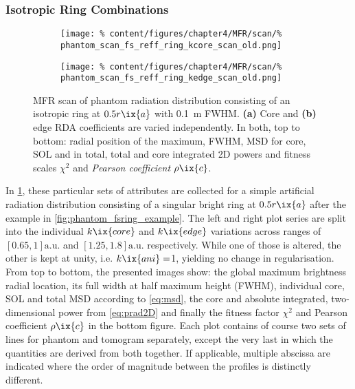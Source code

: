             \subsubsection*{Isotropic Ring Combinations}%
%
                \begin{figure}[t]%
                    \centering%
                    \begin{subfigure}{0.45\textwidth}%
                        \centering%
                        \texttt{[image: \%
                            content/figures/chapter4/MFR/scan/\%
                            phantom\_scan\_fs\_reff\_ring\_kcore\_scan\_old.png]}%
                        \caption{}%
                    \end{subfigure}%
                    \begin{subfigure}{0.45\textwidth}%
                        \centering%
                        \texttt{[image: \%
                            content/figures/chapter4/MFR/scan/\%
                            phantom\_scan\_fs\_reff\_ring\_kedge\_scan\_old.png]}%
                        \caption{}%
                    \end{subfigure}%
                    \caption{MFR scan of phantom radiation distribution consisting of an isotropic ring at $0.5r\ix{a}$ with \SI{0.1}{\meter} FWHM. \textbf{(a)} Core and \textbf{(b)} edge RDA coefficients are varied independently. In both, top to bottom: radial position of the maximum, FWHM, MSD for core, SOL and in total, total and core integrated 2D powers and fitness scales $\chi^{2}$ and \textit{Pearson coefficient} $\rho\ix{c}$.}\label{fig:phantom_scans_fsring_kani_coreEdge}%
                \end{figure}%
%
                In \cref{fig:phantom_scans_fsring_kani_coreEdge}, these particular sets of attributes are collected for a simple artificial radiation distribution consisting of a singular bright ring at $0.5r\ix{a}$ after the example in \cref{fig:phantom_fsring_example}. The left and right plot series are split into the individual $k\ix{core}$ and $k\ix{edge}$ variations across ranges of $\left[0.65, 1\right]\text{a.u.}$ and $\left[1.25,1.8\right]\text{a.u.}$ respectively. While one of those is altered, the other is kept at unity, i.e. $k\ix{ani}=$\SI{1}{\arbitraryunit}, yielding no change in regularisation. From top to bottom, the presented images show: the global maximum brightness radial location, its full width at half maximum height (FWHM), individual core, SOL and total MSD according to \cref{eq:msd}, the core and absolute integrated, two-dimensional power from \cref{eq:prad2D} and finally the fitness factor $\chi^{2}$ and Pearson coefficient $\rho\ix{c}$ in the bottom figure. Each plot contains of course two sets of lines for phantom and tomogram separately, except the very last in which the quantities are derived from both together. If applicable, multiple abscissa are indicated where the order of magnitude between the profiles is distinctly different.\\%

